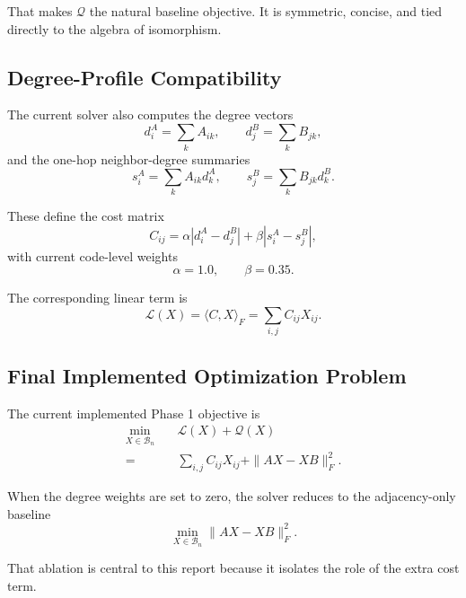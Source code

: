 \documentclass[11pt]{article}
\begin{document}
That makes $\mathcal{Q}$ the natural baseline objective.
It is symmetric, concise, and tied directly to the algebra of isomorphism.

\subsection{Degree-Profile Compatibility}

The current solver also computes the degree vectors
\begin{equation}
d^A_i = \sum_k A_{ik}, \qquad d^B_j = \sum_k B_{jk},
\end{equation}
and the one-hop neighbor-degree summaries
\begin{equation}
s^A_i = \sum_k A_{ik} d^A_k, \qquad s^B_j = \sum_k B_{jk} d^B_k.
\end{equation}

These define the cost matrix
\begin{equation}
C_{ij} = \alpha |d^A_i - d^B_j| + \beta |s^A_i - s^B_j|,
\end{equation}
with current code-level weights
\begin{equation}
\alpha = 1.0, \qquad \beta = 0.35.
\end{equation}

The corresponding linear term is
\begin{equation}
\mathcal{L}(X) = \langle C, X \rangle_F = \sum_{i,j} C_{ij} X_{ij}.
\end{equation}

\subsection{Final Implemented Optimization Problem}

The current implemented Phase 1 objective is
\begin{equation}
\boxed{
\begin{aligned}
\min_{X \in \mathcal{B}_n} \quad & \mathcal{L}(X) + \mathcal{Q}(X) \\
= \quad & \sum_{i,j} C_{ij} X_{ij} + \|AX - XB\|_F^2.
\end{aligned}}
\end{equation}

When the degree weights are set to zero, the solver reduces to the adjacency-only baseline
\begin{equation}
\min_{X \in \mathcal{B}_n} \|AX - XB\|_F^2.
\end{equation}

That ablation is central to this report because it isolates the role of the extra cost term.
\end{document}
